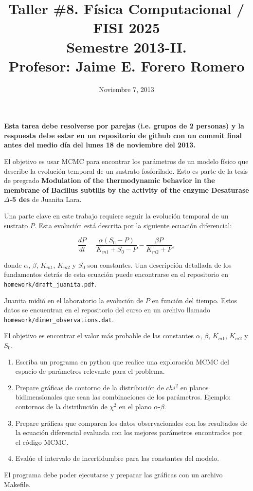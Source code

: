 \documentclass{article}
\title{Taller \#8. F\'isica Computacional / FISI 2025 \\Semestre
  2013-II. \\ Profesor: Jaime E. Forero Romero}
\date{Noviembre 7, 2013}
\begin{document}
\maketitle

{\bf Esta tarea debe resolverse por parejas (i.e. grupos de 2
  personas) y la respuesta debe estar en un repositorio de github con
  un commit final antes del medio d\'ia del lunes 18 de noviembre del
  2013.} 

El objetivo es usar MCMC para encontrar los par\'ametros de un modelo
f\'isico que describe la evoluci\'on temporal de un sustrato
fosforilado. Esto es parte de la tesis de pregrado {\bf Modulation of
  the thermodynamic behavior in the membrane of Bacillus subtilis by
  the activity of the enzyme Desaturase $\Delta$-5 des} de Juanita
Lara. 

Una parte clave en este trabajo requiere seguir la evoluci\'on
temporal de un sustrato $P$. Esta evoluci\'on est\'a descrita por la
siguiente ecuaci\'on diferencial:

\begin{equation}
\frac{dP}{dt} = \frac{\alpha(S_0 -P)}{K_{m1}+S_0-P} - \frac{\beta
  P}{K_{m2}+P}, 
\end{equation}

donde $\alpha$, $\beta$, $K_{m1}$, $K_{m2}$ y $S_0$ son constantes. Una
descripci\'on detallada de los fundamentos detr\'as de esta ecuaci\'on
puede encontrarse en el repositorio en
\verb"homework/draft_juanita.pdf". 

Juanita midi\'o en el laboratorio la evoluci\'on de $P$ en funci\'on
del tiempo. Estos datos se encuentran en el repositorio del curso en
un archivo llamado \verb"homework/dimer_observations.dat".

El objetivo es encontrar el valor m\'as probable de las constantes
$\alpha$, $\beta$, $K_{m1}$, $K_{m2}$ y $S_0$. 

\begin{enumerate}
\item Escriba un programa en python que realice una exploraci\'on MCMC
  del espacio de par\'ametros relevante para el problema.

\item Prepare gr\'aficas de contorno de la distribuci\'on de $chi^2$
  en planos bidimensionales que sean las combinaciones de los
  par\'ametros. Ejemplo: contornos de la distribuci\'on de $\chi^2$ en el
  plano $\alpha$-$\beta$.

\item Prepare gr\'aficas que comparen los datos observacionales con
  los resultados de la ecuaci\'on diferencial evaluada con los mejores
  par\'ametros encontrados por el c\'odigo MCMC.

\item Eval\'ue el intervalo de incertidumbre para las constantes del
  modelo. 



\end{enumerate}
El programa debe poder ejecutarse y preparar las gr\'aficas con
  un archivo Makefile.
\end{document}
